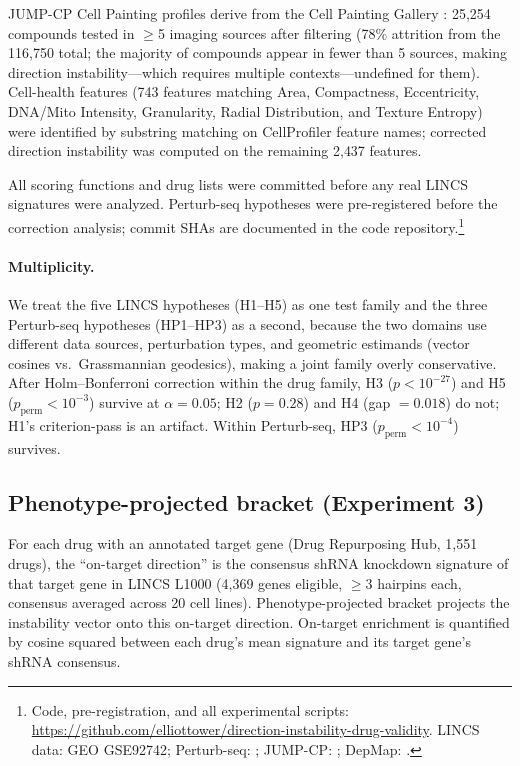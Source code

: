 \documentclass{article}
\begin{document}
JUMP-CP Cell Painting profiles derive from the Cell Painting Gallery
\citep{chandrasekaran2023jump}: 25{,}254 compounds tested in $\geq$5
imaging sources after filtering (78\% attrition from the 116{,}750
total; the majority of compounds appear in fewer than 5 sources,
making direction instability---which requires multiple
contexts---undefined for them). Cell-health features (743 features matching Area,
Compactness, Eccentricity, DNA/Mito Intensity, Granularity, Radial
Distribution, and Texture Entropy) were identified by substring matching
on CellProfiler feature names; corrected direction instability was computed
on the remaining 2{,}437 features.

All scoring functions and drug lists were committed before any real LINCS
signatures were analyzed. Perturb-seq hypotheses were pre-registered before
the correction analysis; commit SHAs are documented in the code
repository.\footnote{Code, pre-registration, and all experimental
scripts: \url{https://github.com/elliottower/direction-instability-drug-validity}.
LINCS data: GEO GSE92742; Perturb-seq: \citet{replogle2022mapping};
JUMP-CP: \citet{chandrasekaran2023jump}; DepMap: \citet{dempster2021chronos}.}

\paragraph{Multiplicity.}
We treat the five LINCS hypotheses (H1--H5) as one test family and the
three Perturb-seq hypotheses (HP1--HP3) as a second, because the two
domains use different data sources, perturbation types, and geometric
estimands (vector cosines vs.\ Grassmannian geodesics), making a joint
family overly conservative. After Holm--Bonferroni
correction within the drug family, H3 ($p < 10^{-27}$) and H5
($p_{\text{perm}} < 10^{-3}$) survive at $\alpha = 0.05$; H2 ($p = 0.28$)
and H4 (gap $= 0.018$) do not; H1's criterion-pass is an artifact.
Within Perturb-seq, HP3 ($p_{\text{perm}} < 10^{-4}$) survives.

\subsection{Phenotype-projected bracket (Experiment 3)}

For each drug with an annotated target gene (Drug Repurposing Hub,
1{,}551 drugs), the ``on-target direction'' is the consensus shRNA
knockdown signature of that target gene in LINCS L1000 (4{,}369 genes
eligible, $\geq$3 hairpins each, consensus averaged across 20 cell lines).
Phenotype-projected bracket projects the instability vector onto this
on-target direction. On-target enrichment is quantified by cosine squared
between each drug's mean signature and its target gene's shRNA consensus.
\end{document}
